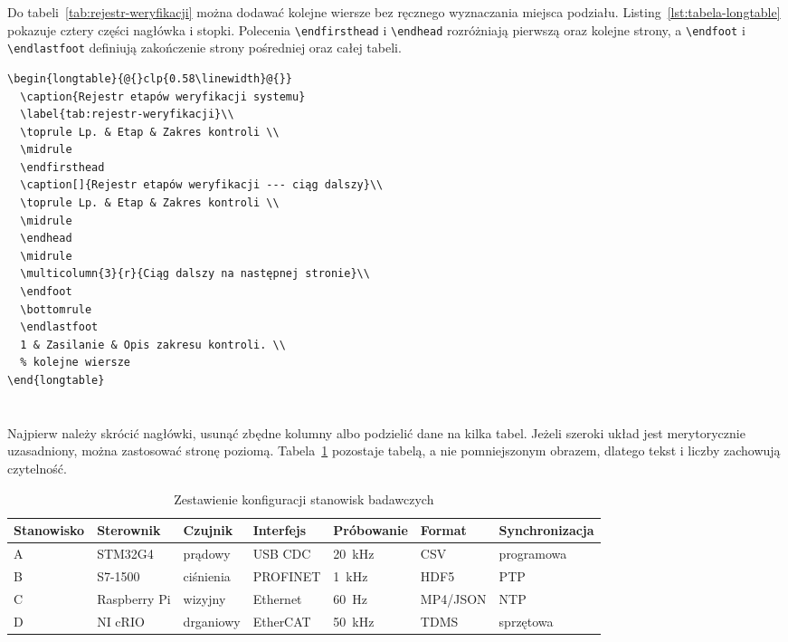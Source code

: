 Do tabeli~\ref{tab:rejestr-weryfikacji} można dodawać kolejne wiersze bez ręcznego
wyznaczania miejsca podziału. Listing~\ref{lst:tabela-longtable} pokazuje cztery części
nagłówka i stopki. Polecenia \verb|\endfirsthead| i \verb|\endhead| rozróżniają
pierwszą oraz kolejne strony, a \verb|\endfoot| i \verb|\endlastfoot| definiują
zakończenie strony pośredniej oraz całej tabeli.

\begin{lstlisting}[style=thesis,caption={Szkielet tabeli wielostronicowej},label={lst:tabela-longtable}]
\begin{longtable}{@{}clp{0.58\linewidth}@{}}
  \caption{Rejestr etapów weryfikacji systemu}
  \label{tab:rejestr-weryfikacji}\\
  \toprule Lp. & Etap & Zakres kontroli \\
  \midrule
  \endfirsthead
  \caption[]{Rejestr etapów weryfikacji --- ciąg dalszy}\\
  \toprule Lp. & Etap & Zakres kontroli \\
  \midrule
  \endhead
  \midrule
  \multicolumn{3}{r}{Ciąg dalszy na następnej stronie}\\
  \endfoot
  \bottomrule
  \endlastfoot
  1 & Zasilanie & Opis zakresu kontroli. \\
  % kolejne wiersze
\end{longtable}
\end{lstlisting}

\section{}
\label{sec:szeroka-tabela}

Najpierw należy skrócić nagłówki, usunąć zbędne kolumny albo podzielić dane na kilka
tabel. Jeżeli szeroki układ jest merytorycznie uzasadniony, można zastosować stronę
poziomą. Tabela~\ref{tab:szeroka} pozostaje tabelą, a nie pomniejszonym obrazem, dlatego
tekst i liczby zachowują czytelność.

\begin{thesislandscape}
\begin{table}[p]
  \centering
  \caption{Zestawienie konfiguracji stanowisk badawczych}
  \label{tab:szeroka}
  \begin{tabular}{@{}lllllll@{}}
    \toprule
    Stanowisko & Sterownik & Czujnik & Interfejs & Próbowanie & Format & Synchronizacja \\
    \midrule
    A & STM32G4 & prądowy & USB CDC & \SI{20}{\kilo\hertz} & CSV & programowa \\
    B & S7-1500 & ciśnienia & PROFINET & \SI{1}{\kilo\hertz} & HDF5 & PTP \\
    C & Raspberry Pi & wizyjny & Ethernet & \SI{60}{\hertz} & MP4/JSON & NTP \\
    D & NI cRIO & drganiowy & EtherCAT & \SI{50}{\kilo\hertz} & TDMS & sprzętowa \\
    \bottomrule
  \end{tabular}
\end{table}
\end{thesislandscape}

